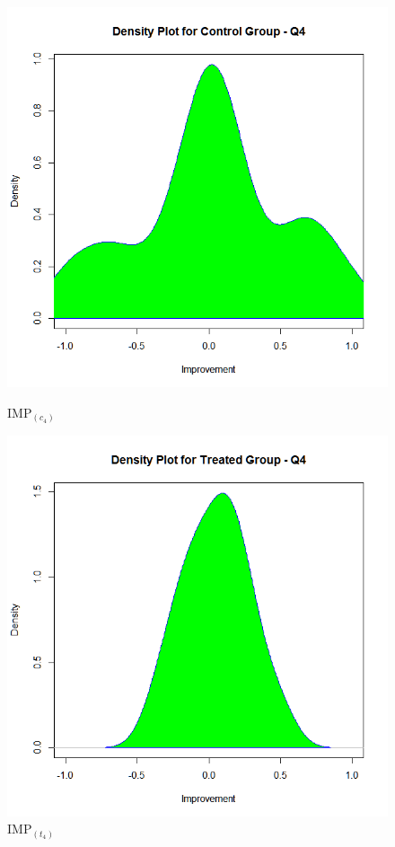 \begin{figure}
	\centering
	\begin{minipage}{.5\textwidth}
		\centering
		\includegraphics[width=1\linewidth]{figures/Imp_Control-q4}
		\caption{IMP$_{(c_4)}$}
		\label{fig:Imp_Control-q4}
	\end{minipage}%
	\begin{minipage}{.5\textwidth}
		\centering
		\includegraphics[width=1\linewidth]{figures/Imp_Treated-q4}
		\caption{IMP$_{(t_4)}$}
		\label{fig:Imp_Treated-q4}
	\end{minipage}
\end{figure}

